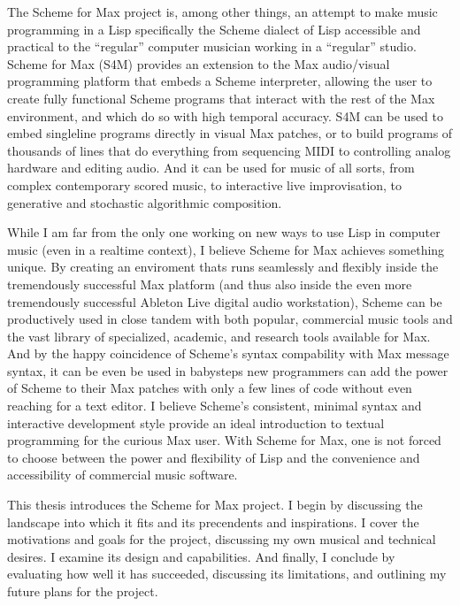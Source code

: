 \documentclass[letterpaper,10pt,english]{sphinxmanual}
\begin{document}
\sphinxAtStartPar
The Scheme for Max project is, among other things, an attempt to make music programming in a Lisp
\sphinxhyphen{} specifically the Scheme dialect of Lisp \sphinxhyphen{} accessible and practical to the “regular” computer musician working in a “regular” studio.
Scheme for Max (S4M) provides an extension to the Max audio/visual programming platform
that embeds a Scheme interpreter, allowing the user to create fully functional Scheme programs that
interact with the rest of the Max environment, and which do so with high temporal accuracy.
S4M can be used to embed single\sphinxhyphen{}line programs directly in visual Max patches, or to build
programs of thousands of lines that do everything from sequencing MIDI
to controlling analog hardware and editing audio.
And it can be used for music of all sorts, from complex contemporary scored music, to interactive
live improvisation, to generative and stochastic algorithmic composition.

\sphinxAtStartPar
While I am far from the only one working on new ways to use Lisp in computer music (even in a realtime context),
I believe Scheme for Max achieves something unique.
By creating an enviroment thats runs seamlessly and flexibly inside the tremendously successful
Max platform (and thus also inside the even more tremendously successful Ableton Live digital audio workstation),
Scheme can be productively used in close tandem with both popular,
commercial music tools and the vast library of specialized, academic, and research tools available for Max.
And by the happy coincidence of Scheme’s syntax compability with Max message syntax, it can be even be used
in baby\sphinxhyphen{}steps \sphinxhyphen{} new programmers can add the power of Scheme to their Max patches with
only a few lines of code without even reaching for a text editor.
I believe Scheme’s consistent, minimal syntax and interactive development style provide an ideal
introduction to textual programming for the curious Max user.
With Scheme for Max, one is not forced to choose between the power and flexibility of Lisp and the
convenience and accessibility of commercial music software.

\sphinxAtStartPar
This thesis introduces the Scheme for Max project. I begin by discussing the landscape into which it fits
and its precendents and inspirations. I cover the motivations and goals for the project, discussing
my own musical and technical desires.
I examine its design and capabilities. And finally, I conclude by evaluating
how well it has succeeded, discussing its limitations, and outlining my future plans for the project.
\end{document}
